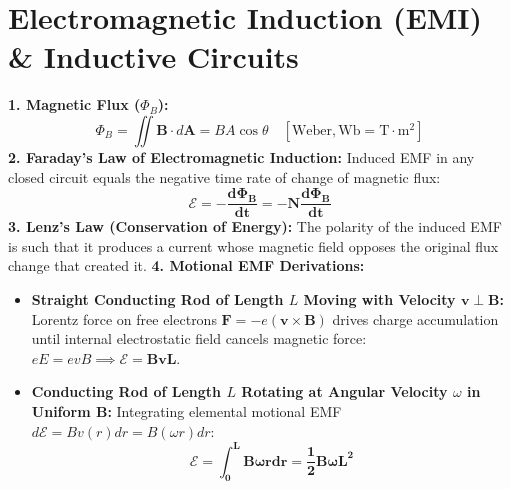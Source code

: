 \documentclass[10pt,a4paper]{article}
\begin{document}
\section{Electromagnetic Induction (EMI) \& Inductive Circuits}

\begin{conceptbox}
\textbf{1. Magnetic Flux ($\Phi_B$):}
\begin{equation}
  \Phi_B = \iint \mathbf{B}\cdot d\mathbf{A} = B A \cos\theta \quad [\mathrm{Weber}, \mathrm{Wb} = \mathrm{T}\cdot\mathrm{m}^2]
\end{equation}
\textbf{2. Faraday's Law of Electromagnetic Induction:}
Induced EMF in any closed circuit equals the negative time rate of change of magnetic flux:
\begin{equation}
  \mathbf{\mathcal{E} = -\frac{d\Phi_B}{dt} = -N \frac{d\Phi_B}{dt}}
\end{equation}
\textbf{3. Lenz's Law (Conservation of Energy):}
The polarity of the induced EMF is such that it produces a current whose magnetic field opposes the original flux change that created it.
\textbf{4. Motional EMF Derivations:}
\begin{itemize}
  \item \textbf{Straight Conducting Rod of Length $L$ Moving with Velocity $\mathbf{v} \perp \mathbf{B}$:}
  Lorentz force on free electrons $\mathbf{F} = -e(\mathbf{v} \times \mathbf{B})$ drives charge accumulation until internal electrostatic field cancels magnetic force: $eE = evB \implies \mathbf{\mathcal{E} = B v L}$.
  \item \textbf{Conducting Rod of Length $L$ Rotating at Angular Velocity $\omega$ in Uniform $\mathbf{B}$:}
  Integrating elemental motional EMF $d\mathcal{E} = B v(r) dr = B (\omega r) dr$:
  \begin{equation}
    \mathbf{\mathcal{E} = \int_0^L B \omega r dr = \frac{1}{2} B \omega L^2}
  \end{equation}
\end{itemize}
\end{conceptbox}
\end{document}
